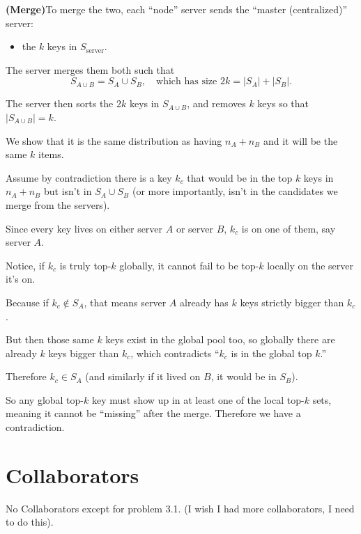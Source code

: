 \documentclass[11pt]{article}
\begin{document}
\begin{enumerate}[label=(\alph*)]
\textbf{(Merge)}\quad To merge the two, each ``node'' server sends the ``master (centralized)'' server:

\begin{itemize}
\item the $k$ keys in $S_{\text{server}}$.
\end{itemize}

The server merges them both such that
\[
S_{A\cup B}=S_A \cup S_B,
\quad \text{which has size } 2k = |S_A| + |S_B|.
\]

The server then sorts the $2k$ keys in $S_{A\cup B}$, and removes $k$ keys so that $|S_{A\cup B}|=k$.

We show that it is the same distribution as having $n_A+n_B$ and it will be the same $k$ items.

Assume by contradiction there is a key $k_c$ that would be in the top $k$ keys in $n_A + n_B$ but isn't in $S_A \cup S_B$ (or more importantly, isn't in the candidates we merge from the servers).

Since every key lives on either server $A$ or server $B$, $k_c$ is on one of them, say server $A$.

Notice, if $k_c$ is truly top-$k$ globally, it cannot fail to be top-$k$ locally on the server it's on.

Because if $k_c \notin S_A$, that means server $A$ already has $k$ keys strictly bigger than $k_c$.

But then those same $k$ keys exist in the global pool too, so globally there are already $k$ keys bigger than $k_c$,
which contradicts ``$k_c$ is in the global top $k$.''

Therefore $k_c \in S_A$ (and similarly if it lived on $B$, it would be in $S_B$).

So any global top-$k$ key must show up in at least one of the local top-$k$ sets,
meaning it cannot be ``missing'' after the merge. Therefore we have a contradiction.
\end{enumerate}

\section*{Collaborators}
No Collaborators except for problem 3.1. (I wish I had more collaborators, I need to do this).
\end{document}
